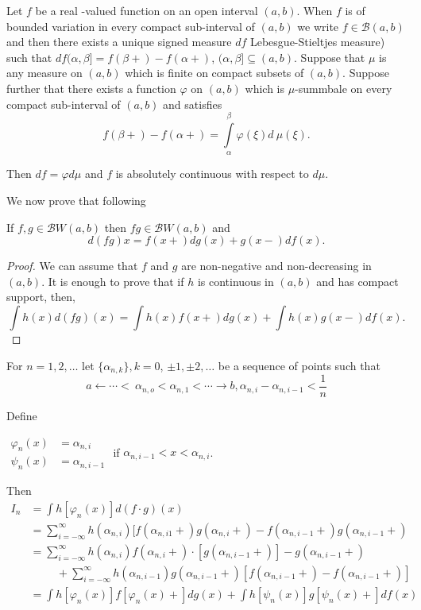 Let $f$  be a real -valued  function on an open interval $(a,b)$. When
$f$ is of bounded variation in every compact sub-interval of $(a,b)$
we write $f \in \mathscr{B} (a,b)$ and then there exists a unique
signed measure $df$\pageoriginale 
Lebesgue-Stieltjes measure) such that $df(\alpha,
\beta ] = f(\beta +) - f( \alpha +)$, $(\alpha, \beta ] \subseteq
  (a,b)$. Suppose that $\mu$ is any measure on $(a,b)$ which is finite
  on compact subsets of $(a,b)$. Suppose further that there exists a
  function $\varphi$ on $(a,b)$ which is $\mu$-summbale on every
  compact sub-interval of $(a,b)$ and satisfies 
$$
f(\beta+)- f(\alpha + ) = \int\limits^{\beta}_\alpha \varphi (\xi) d
~\mu (\xi). 
$$

Then $df = \varphi d \mu$ and $f$ is absolutely continuous with
respect to $d \mu$. 

We now prove that following 

\begin{lemma*}
  If $f,g \in \mathscr{B} W (a,b)$ then $fg \in \mathscr{B} W(a,b)$ and 
  $$
  d(fg) x=  f(x+) dg (x) + g (x-) df (x).
  $$
\end{lemma*}

\begin{proof}
We can assume that $f$ and $g$ are non-negative and non-decreasing
  in $(a,b)$. It is enough to prove that if $h$ is continuous in
  $(a,b)$ and has compact support, then, 
  $$
  \int h(x) d (fg) (x) = \int h(x) f(x +) dg(x)  + \int h(x) g(x-) df (x).
  $$
\end{proof}

For $n= 1,2, \ldots$ let $\{ \alpha_{n,k}\}, k=0$, $\pm 1, \pm 2,
\ldots$ be a sequence of points such that  
$$
a \leftarrow \cdots <\  \alpha_{n,o} <  \alpha_{n,1} < \cdots \to b,
\alpha_{n,i} - \alpha_{n, i-1} <\frac{1}{n} 
$$

Define

$
\begin{aligned}
\varphi_n (x) &= \alpha_{n,i} \\
\psi_n (x) &= \alpha_{n, i-1}
\end{aligned}$
if $ \alpha_{n, i-1} < x < \alpha_{n,i}$.

Then\pageoriginale 
\begin{align*}
  I_n &= \int h [ \varphi_{n} (x) ] d (f\cdot g)(x) \\
  & = \sum^{\infty}_{i =  - \infty} h (\alpha _{n, i})  [f (\alpha_{n, i 1} + ) g (\alpha_{n, i} +) - f (\alpha _{n,i-1}+)g(\alpha_{n, i-1}+)\\ 
    & = \sum^\infty_{i = - \infty} h(\alpha_{n,i})
    f(\alpha_{n,i}+)\cdot 
[g(\alpha_{n, i-1}+)]- g (\alpha_{n,i-1}+)\\ 
    & \hspace{1cm}+ \sum_{i= - \infty}^\infty h(\alpha_{n, i -1})g(\alpha_{n,i-1}+) [ f (\alpha_{n, i-1}+)-f
      (\alpha_{n, i-1}+)]\\ 
    & =  \int h [\varphi_n(x)] f [\varphi_n(x)+] dg(x) + \int
    h [\psi_n (x)] g [\psi_n (x) +] df(x)   
\end{align*}

